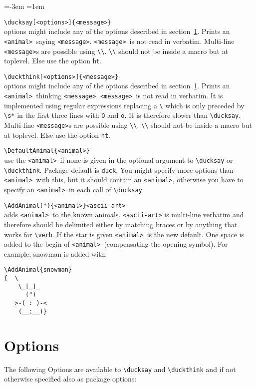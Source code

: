 \documentclass[a4paper,10pt]{article}
\newcommand*{\anml}{\texttt{<animal>}}
\newcommand*{\msg}{\texttt{<message>}}
\newenvironment{codedescription}{%
  \parindent=-3em%
  \parskip=1em%
  \par%
}{}
\begin{document}
\begin{codedescription}
\verb|\ducksay[<options>]{<message>}|\\
  options might include any of the options described in
  section~\ref{sec:options}. Prints an \anml\ saying \msg. \msg\ is not read in
  verbatim. Multi-line \msg s are possible using \verb|\\|. \verb|\\| should not
  be inside a macro but at toplevel. Else use the option \texttt{ht}.

\verb|\duckthink[<options>]{<message>}|\\
  options might include any of the options described in
  section~\ref{sec:options}. Prints an \anml\ thinking \msg. \msg\ is not read
  in verbatim. It is implemented using regular expressions replacing a \verb|\|
  which is only preceded by \verb|\s*| in the first three lines with \verb|O|
  and \verb|o|. It is therefore slower than \verb|\ducksay|. Multi-line \msg s
  are possible using \verb|\\|. \verb|\\| should not be inside a macro but at
  toplevel. Else use the option \texttt{ht}.

\verb|\DefaultAnimal{<animal>}|\\
  use the \anml\ if none is given in the optional argument to \verb|\ducksay| or
  \verb|\duckthink|. Package default is \texttt{duck}. You might specify more
  options than \anml\ with this, but it should contain an \anml, otherwise you
  have to specify an \anml\ in each call of \verb|\ducksay|.

\verb|\AddAnimal(*){<animal>}<ascii-art>|\\
  adds \anml\ to the known animals. \texttt{<ascii-art>} is multi-line verbatim
  and therefore should be delimited either by matching braces or by anything
  that works for \verb|\verb|. If the star is given \anml\ is the new default.
  One space is added to the begin of \anml\ (compensating the opening symbol).
  For example, snowman is added with:\\[1ex]
  \begin{minipage}{\linewidth}
\begin{verbatim}
\AddAnimal{snowman}
{  \
    \_[_]_
      (")
   >-( : )-<
    (__:__)}
\end{verbatim}
  \end{minipage}
\end{codedescription}
\section{Options}\label{sec:options}%
{\reversemarginpar{}}
The following Options are available to \verb|\ducksay| and \verb|\duckthink| and
if not otherwise specified also as package options:
\end{document}
